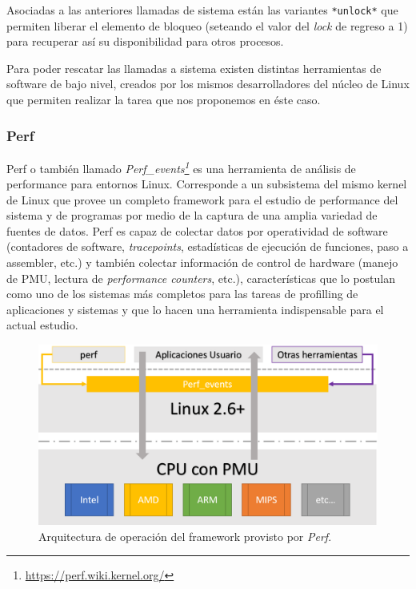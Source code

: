 Asociadas a las anteriores llamadas de sistema están las variantes \verb=*unlock*= que permiten liberar el elemento de bloqueo (seteando el valor del \emph{lock} de regreso a 1) para recuperar así su disponibilidad para otros procesos.

Para poder rescatar las llamadas a sistema existen distintas herramientas de software de bajo nivel, creados por los mismos desarrolladores del núcleo de Linux que permiten realizar la tarea que nos proponemos en éste caso.

\subsubsection{Perf}
Perf \cite{slides:perfTools} o también llamado \emph{Perf\_events\footnote{\url{https://perf.wiki.kernel.org/}}} es una herramienta de análisis de performance para entornos Linux. Corresponde a un subsistema del mismo kernel de Linux que provee un completo framework para el estudio de performance del sistema y de programas por medio de la captura de una amplia variedad de fuentes de datos. Perf es capaz de colectar datos por operatividad de software (contadores de software, \emph{tracepoints}, estadísticas de ejecución de funciones, paso a assembler, etc.) y también colectar información de control de hardware (manejo de PMU, lectura de \emph{performance counters}, etc.), características que lo postulan como uno de los sistemas más completos para las tareas de profilling de aplicaciones y sistemas y que lo hacen una herramienta indispensable para el actual estudio.

\begin{figure}[!h]
	\centering
	\includegraphics[scale=.45]{imagenes/perfArchitecture.png}
	\caption{Arquitectura de operación del framework provisto por \emph{Perf}.}
	\label{fig:perfFramework}
\end{figure}


